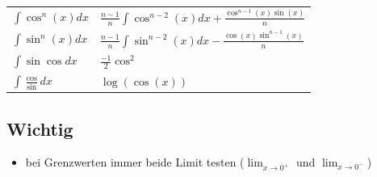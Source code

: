 \documentclass[7pt,landscape, margin = 0.1mm]{article}
\begin{document}
\begin{multicols}{4}
\begin{flushleft}
\begin{center}
\begin{tabularx}{\linewidth}{>{\centering\arraybackslash}X>{\centering\arraybackslash}X}
 $\int \cos^n(x) d x$ & $\frac{n-1}{n} \int \cos^{n-2}(x) d x+\frac{\cos^{n-1}(x) \sin (x)}{n}$ \\
$ \int \sin^n(x) d x $ & $\frac{n-1}{n} \int \sin ^{n-2}(x) d x-\frac{\cos (x) \sin ^{n-1}(x)}{n}$\\


$\int \sin \cos dx$ & $\frac{-1}{2}\cos^2$\\
  $\int \frac{\cos}{ \sin} dx$ & $\log(\cos(x))$\\
  
  \bottomrule
 \end{tabularx}
\end{center}
\begin{flushleft}
\subsection{\colorbox{yellow!30}{Wichtig}}
\begin{itemize}
\item bei Grenzwerten immer beide Limit testen ($\lim_{x \to 0^{+}}$ und $\lim_{x \to 0^{-}} $)
\end{itemize}
\tiny

\end{flushleft}
\end{flushleft}
\end{multicols}
\end{document}
